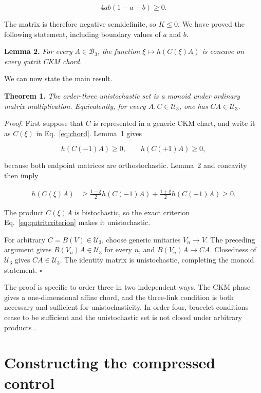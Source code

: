 \documentclass[aip,jmp,amsmath,amssymb,preprint,nofootinbib]{revtex4-2}
\newcommand{\Bd}{\mathcal{B}_3}
\newcommand{\Ud}{\mathcal{U}_3}
\begin{document}
\begin{equation}
 4ab(1-a-b)\geq0.                                  \label{eq:detK}
\end{equation}

The matrix is therefore negative semidefinite, so $K\leq0$.  We have proved
the following statement, including boundary values of $a$ and $b$.

\medskip
\noindent\textbf{Lemma 2.}
\emph{For every $A\in\Bd$, the function $\xi\mapsto h(C(\xi)A)$ is concave
on every qutrit CKM chord.}

\medskip
We can now state the main result.

\medskip
\noindent\textbf{Theorem 1.}
\emph{The order-three unistochastic set is a monoid under ordinary matrix
multiplication.  Equivalently, for every $A,C\in\Ud$, one has $CA\in\Ud$.}

\medskip
\noindent\textit{Proof.}
First suppose that $C$ is represented in a generic CKM chart, and write it as
$C(\xi)$ in Eq.~\eqref{eq:chord}.  Lemma~1 gives

\begin{equation}
 h(C(-1)A)\geq0,\qquad h(C(+1)A)\geq0,             \label{eq:endpoints}
\end{equation}

because both endpoint matrices are orthostochastic.  Lemma~2 and concavity
then imply

\begin{align}
 h(C(\xi)A)
 &\geq \frac{1-\xi}{2}h(C(-1)A)
       +\frac{1+\xi}{2}h(C(+1)A)\geq0.            \label{eq:concavitybound}
\end{align}

The product $C(\xi)A$ is bistochastic, so the exact criterion
Eq.~\eqref{eq:qutritcriterion} makes it unistochastic.

For arbitrary $C=B(V)\in\Ud$, choose generic unitaries $V_n\to V$.  The
preceding argument gives $B(V_n)A\in\Ud$ for every $n$, and
$B(V_n)A\to CA$.  Closedness of $\Ud$ gives $CA\in\Ud$.  The identity matrix
is unistochastic, completing the monoid statement. \hfill$\square$

The proof is specific to order three in two independent ways.  The CKM
phase gives a one-dimensional affine chord, and the three-link condition is
both necessary and sufficient for unistochasticity.  In order four, bracelet
conditions cease to be sufficient and the unistochastic set is not closed
under arbitrary products \cite{Bengtsson2005,RajchelMieldzioc2022}.

\section{Constructing the compressed control}
\label{sec:construction}
\end{document}
